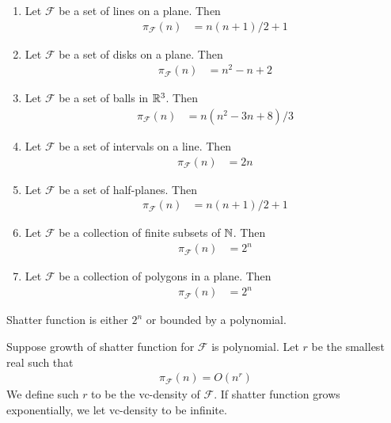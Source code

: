 \documentclass{amsart}
\newcommand{\F}{\mathcal F}
\begin{document}
\begin{Example}
	\begin{enumerate}
		\item Let $\F$ be a set of lines on a plane. Then
		\begin{align*}
			\pi_\F(n) &= n(n+1)/2 + 1
		\end{align*}
		\item Let $\F$ be a set of disks on a plane. Then
		\begin{align*}
			\pi_\F(n) &= n^2 - n + 2
		\end{align*}
		\item Let $\F$ be a set of balls in $\mathbb{R}^3$. Then
		\begin{align*}
			\pi_\F(n) &= n(n^2 - 3n + 8)/3
		\end{align*}
		\item Let $\F$ be a set of intervals on a line. Then
		\begin{align*}
			\pi_\F(n) &= 2n
		\end{align*}
		\item Let $\F$ be a set of half-planes. Then
		\begin{align*}
			\pi_\F(n) &= n(n+1)/2 + 1
		\end{align*}
		\item Let $\F$ be a collection of finite subsets of $\mathbb{N}$. Then
		\begin{align*}
			\pi_\F(n) &= 2^n
		\end{align*}
		\item Let $\F$ be a collection of polygons in a plane. Then
		\begin{align*}
			\pi_\F(n) &= 2^n
		\end{align*}
	\end{enumerate}
\end{Example}

\begin{Theorem} 
	Shatter function is either $2^n$ or bounded by a polynomial.
\end{Theorem}

\begin{Definition}
	Suppose growth of shatter function for $\F$ is polynomial.
	Let $r$ be the smallest real such that 
	\begin{align*}
		\pi_\F(n) = O(n^r)
	\end{align*}
	We define such $r$ to be the vc-density of $\F$.
	If shatter function grows exponentially, we let vc-density to be infinite.
\end{Definition}
\end{document}
